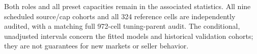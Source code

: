 Both roles and all preset capacities remain in the associated statistics.
All nine scheduled source/cap cohorts and all 324 reference cells are independently audited, with a matching full 972-cell tuning-parent audit. The conditional,
unadjusted intervals concern the fitted models and historical validation
cohorts; they are not guarantees for new markets or seller behavior.
